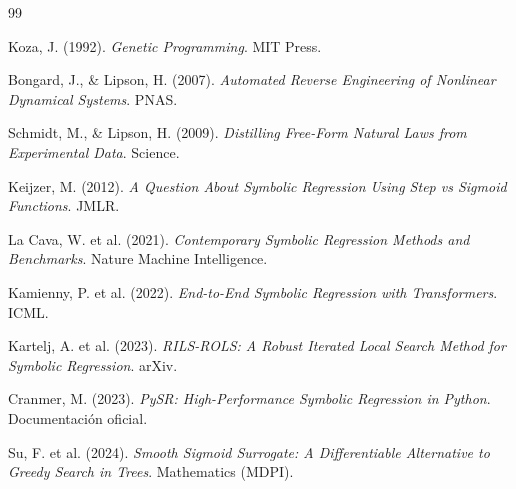 \documentclass[12pt,a4paper]{article}
\begin{document}

\begin{thebibliography}{99}

 Koza, J. (1992). \textit{Genetic Programming}. MIT Press.

 Bongard, J., \& Lipson, H. (2007). \textit{Automated Reverse Engineering of Nonlinear Dynamical Systems}. PNAS.

 Schmidt, M., \& Lipson, H. (2009). \textit{Distilling Free-Form Natural Laws from Experimental Data}. Science.

 Keijzer, M. (2012). \textit{A Question About Symbolic Regression Using Step vs Sigmoid Functions}. JMLR.

 La Cava, W. et al. (2021). \textit{Contemporary Symbolic Regression Methods and Benchmarks}. Nature Machine Intelligence.

 Kamienny, P. et al. (2022). \textit{End-to-End Symbolic Regression with Transformers}. ICML.

 Kartelj, A. et al. (2023). \textit{RILS-ROLS: A Robust Iterated Local Search Method for Symbolic Regression}. arXiv.

 Cranmer, M. (2023). \textit{PySR: High-Performance Symbolic Regression in Python}. Documentación oficial.

 Su, F. et al. (2024). \textit{Smooth Sigmoid Surrogate: A Differentiable Alternative to Greedy Search in Trees}. Mathematics (MDPI).

\end{thebibliography}
\end{document}
